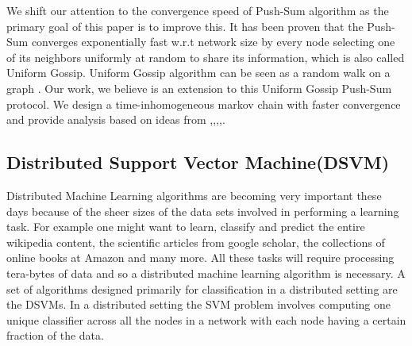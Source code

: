 \documentclass[runningheads,a4paper]{llncs}
\begin{document}
We shift our attention to the convergence speed of Push-Sum algorithm as the primary goal of this paper is to improve this. It has been proven that the Push-Sum converges exponentially fast w.r.t network size by every node selecting one of its neighbors uniformly at random to share its information, which is also called Uniform Gossip. Uniform Gossip algorithm can be seen as a random walk on a graph \cite{lovasz1993random}. Our work, we believe is an extension to this Uniform Gossip Push-Sum protocol. We design a time-inhomogeneous markov chain with faster convergence and provide analysis based on ideas from \cite{douc2004quantitative},\cite{saloff2007convergence},\cite{saloff2009merging},\cite{saloff2010time},\cite{saloff2010merging}.


\subsection{Distributed Support Vector Machine(DSVM)} 

Distributed Machine Learning algorithms are becoming very important these days because of the sheer sizes of the data sets involved in performing a learning task. For example one might want to learn, classify and predict the entire wikipedia content, the scientific articles from google scholar, the collections of online books at Amazon and many more. All these tasks will require processing tera-bytes of data and so a distributed machine learning algorithm is necessary. A set of algorithms designed primarily for classification in a distributed setting are the DSVMs. In a distributed setting the SVM \cite{cortes1995support} problem involves computing one unique classifier across all the nodes in a network with each node having a certain fraction of the data.  
\end{document}
